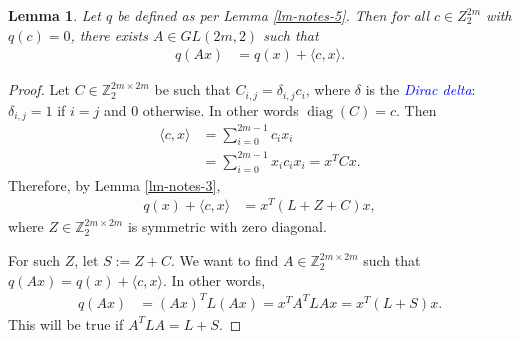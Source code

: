 \documentclass[12pt,a4paper]{article}
\newcommand{\mb}[1]{\mathbb{#1}}
\newcommand{\Z}{\mb{Z}}
\newcommand{\Emph}[1]{\emph{\textcolor{blue}{#1}}}
\newcommand{\diag}[1]{\operatorname{diag}\left(#1\right)}
\newtheorem{Lemma}{Lemma}
\begin{document}
\begin{Lemma}
\label{lm-notes-4}
Let $q$ be defined as per Lemma \ref{lm-notes-5}.
Then for all $c \in Z_2^{2 m}$ with $q(c)=0$, there exists $A \in GL(2 m, 2)$ such that
\begin{align*}
q(A x) &= q(x) + \langle c, x \rangle.
\end{align*}
\end{Lemma}

\begin{proof}
Let $C \in \Z_2^{2 m \times 2 m}$ be such that $C_{i,j} = \delta_{i,j} c_i$, where $\delta$ is the
\Emph{Dirac delta}: $\delta_{i,j}=1$ if $i=j$ and $0$ otherwise. 
In other words $\diag{C} = c$.
Then
\begin{align*}
\langle c, x \rangle 
&= 
\sum_{i=0}^{2m-1} c_i x_i
\\
&= 
\sum_{i=0}^{2m-1} x_i c_i x_i
= 
x^T C x.
\end{align*}
Therefore, by Lemma \ref{lm-notes-3},
\begin{align*}
q(x) + \langle c, x \rangle
&=
x^T (L + Z + C) x,
\end{align*}
where $Z \in \Z_2^{2 m \times 2 m}$ is symmetric with zero diagonal.

For such $Z$, let $S := Z + C$. 
We want to find $A \in \Z_2^{2 m \times 2 m}$ such that $q(A x) = q(x) + \langle c, x \rangle.$
In other words,
\begin{align*}
q(A x) 
&= 
(A x)^T L (A x) 
= 
x^T A^T L A x 
= 
x^T (L + S) x.
\end{align*}
This will be true if $A^T L A = L + S.$


\end{proof}
\end{document}
